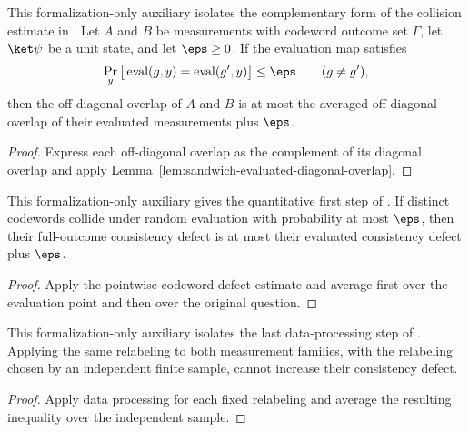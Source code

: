 \begin{lemma}
	\label{lem:sandwich-point-codeword-defect}
	\leanok
	This formalization-only auxiliary isolates the complementary form of the
	collision estimate in \cite[Fact~4.34]{Natarajan2018NEEXP}. Let $A$ and $B$ be
	measurements with codeword outcome set $\Gamma$, let $\ket\psi$ be a unit
	state, and let $\eps\geq 0$. If the evaluation map satisfies
	\[
		\Pr_{y}\big[\operatorname{eval}(g,y)
			=\operatorname{eval}(g',y)\big]\leq\eps
		\qquad(g\neq g'),
	\]
	then the off-diagonal overlap of $A$ and $B$ is at most the averaged
	off-diagonal overlap of their evaluated measurements plus $\eps$.
\end{lemma}
\begin{proof}
	\leanok
	Express each off-diagonal overlap as the complement of its diagonal overlap
	and apply Lemma~\ref{lem:sandwich-evaluated-diagonal-overlap}.
\end{proof}

\begin{lemma}
	\label{lem:sandwich-codeword-defect}
	\leanok
	This formalization-only auxiliary gives the quantitative first step of
	\cite[Fact~4.34]{Natarajan2018NEEXP}. If distinct codewords collide under random evaluation
	with probability at most $\eps$, then their full-outcome consistency defect
	is at most their evaluated consistency defect plus $\eps$.
\end{lemma}
\begin{proof}
	\leanok
	Apply the pointwise codeword-defect estimate and average first over the
	evaluation point and then over the original question.
\end{proof}

\begin{lemma}
	\label{lem:sandwich-random-postprocess}
	\leanok
	This formalization-only auxiliary isolates the last data-processing step of
	\cite[Fact~4.34]{Natarajan2018NEEXP}. Applying the same relabeling to both measurement
	families, with the relabeling chosen by an independent finite sample, cannot
	increase their consistency defect.
\end{lemma}
\begin{proof}
	\leanok
	Apply data processing for each fixed relabeling and average the resulting
	inequality over the independent sample.
\end{proof}

